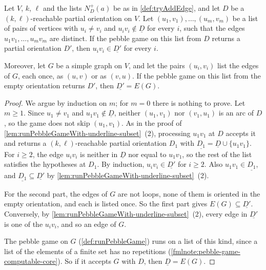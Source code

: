 \begin{lemma}
  \label{lem:runPebbleGame-underline-eq}
  \leanok
  Let $V$, $k$, $\ell$ and the lists $N^+_D(a)$ be as in
  \cref{def:tryAddEdge}, and let $D$ be a $(k, \ell)$-reachable partial
  orientation on $V$. Let $(u_1, v_1), \ldots, (u_m, v_m)$ be a list of
  pairs of vertices with $u_i \ne v_i$ and
  $u_i v_i \notin \underline{D}$ for every $i$, such that the edges
  $u_1 v_1, \ldots, u_m v_m$ are distinct. If the pebble game on this
  list from $D$ returns a partial orientation $D'$, then
  $u_i v_i \in \underline{D'}$ for every $i$.

  Moreover, let $G$ be a simple graph on $V$, and let the pairs
  $(u_i, v_i)$ list the edges of $G$, each once, as $(u, v)$ or as
  $(v, u)$. If the pebble game on this list from the empty orientation
  returns $D'$, then $\underline{D'} = E(G)$.
\end{lemma}
\begin{proof}
  \leanok
  We argue by induction on $m$; for $m = 0$ there is nothing to prove.
  Let $m \ge 1$. Since $u_1 \ne v_1$ and $u_1 v_1 \notin \underline{D}$,
  neither $(u_1, v_1)$ nor $(v_1, u_1)$ is an arc of $D$, so the game
  does not skip $(u_1, v_1)$. As in the proof of
  \cref{lem:runPebbleGameWith-underline-subset}~(2), processing
  $u_1 v_1$ at $D$ accepts it and returns a $(k, \ell)$-reachable
  partial orientation $D_1$ with
  $\underline{D_1} = \underline{D} \cup \{u_1 v_1\}$. For $i \ge 2$, the
  edge $u_i v_i$ is neither in $\underline{D}$ nor equal to $u_1 v_1$,
  so the rest of the list satisfies the hypotheses at $D_1$. By
  induction, $u_i v_i \in \underline{D'}$ for $i \ge 2$. Also
  $u_1 v_1 \in \underline{D_1}$, and
  $\underline{D_1} \subseteq \underline{D'}$ by
  \cref{lem:runPebbleGameWith-underline-subset}~(2).

  For the second part, the edges of $G$ are not loops, none of them is
  oriented in the empty orientation, and each is listed once. So the
  first part gives $E(G) \subseteq \underline{D'}$. Conversely, by
  \cref{lem:runPebbleGameWith-underline-subset}~(2), every edge in
  $\underline{D'}$ is one of the $u_i v_i$, and so an edge of $G$.

  The pebble game on $G$ (\cref{def:runPebbleGame}) runs on a list of
  this kind, since a list of the elements of a finite set has no
  repetitions (\cref{fmlnote:pebble-game-computable-core}). So if it
  accepts $G$ with $D$, then $\underline{D} = E(G)$.
\end{proof}

